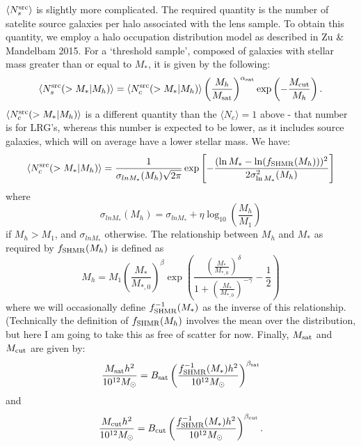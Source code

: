 \documentclass[onecolumn,amsmath,aps,fleqn, superscriptaddress]{revtex4}
\begin{document}
$\langle N_s^{\rm src} \rangle$ is slightly more complicated. The required quantity is the number of satelite source galaxies per halo associated with the lens sample. To obtain this quantity, we employ a halo occupation distribution model as described in Zu \& Mandelbam 2015. For a `threshold sample', composed of galaxies with stellar mass greater than or equal to $M_*$, it is given by the following:
\begin{equation}
\langle  N_s^{\rm src} (>M_* | M_h) \rangle = \langle  N_c^{\rm src} (>M_* | M_h) \rangle  \left(\frac{M_h}{M_{\rm sat}}\right)^{\alpha_{\rm sat}} \exp\left(-\frac{M_{\rm cut}}{M_h}\right).
\label{Nsmean_sources}
\end{equation}
$\langle  N_c^{\rm src} (>M_* | M_h)  \rangle$ is a different quantity than the $\langle N_c \rangle=1$ above - that number is for LRG's, whereas this number is expected to be lower, as it includes source galaxies, which will on average have a lower stellar mass. We have:
\begin{equation}
 \langle N_c^{\rm src} (>M_* | M_h) \rangle = \frac{1}{\sigma_{ln M_*}(M_h)\sqrt{2\pi}} \exp\left[-\frac{(\ln{M_*}-\ln (f_{\rm SHMR}(M_h)) )^2}{2\sigma_{\ln M_*}^2(M_h)}\right]
 \label{Ncsrc}
 \end{equation}
where  
\begin{equation}
\sigma_{ln M_*}(M_h) = \sigma_{ln M_*} + \eta \log_{10}\left(\frac{M_h}{M_1}\right)
\label{sigmaMstar}
\end{equation}
if $M_h>M_1$, and $\sigma_{ln M_*}$ otherwise. The relationship between $M_h$ and $M_*$ as required by $f_{\rm SHMR}(M_h)$ is defined as 
\begin{equation}
M_h = M_1 \left(\frac{M_*}{M_{*,0}}\right)^\beta \exp\left(\frac{\left(\frac{M_*}{M_{*,0}}\right)^\delta}{1 + \left(\frac{M_*}{M_{*,0}}\right)^{-\gamma}} - \frac{1}{2}\right)
\label{Mh_M*}
\end{equation}
where we will occasionally define $f_{\rm SHMR}^{-1}(M_*)$ as the inverse of this relationship. (Technically the definition of $f_{\rm SHMR}(M_h)$ involves the mean over the distribution, but here I am going to take this as free of scatter for now. Finally, $M_{\rm sat}$ and $M_{\rm cut}$ are given by:
\begin{equation}
\frac{M_{\rm sat}h^2}{10^{12} M_\odot} = B_{\rm sat} \left(\frac{f_{\rm SHMR}^{-1}(M_*)h^2}{10^{12} M_\odot}\right)^{\beta_{\rm sat}}
\label{Msat}
\end{equation}
and
\begin{equation}
\frac{M_{\rm cut}h^2}{10^{12} M_\odot} = B_{\rm cut} \left(\frac{f_{\rm SHMR}^{-1}(M_*)h^2}{10^{12} M_\odot}\right)^{\beta_{\rm cut}}.
\label{Mcut}
\end{equation}
\end{document}

